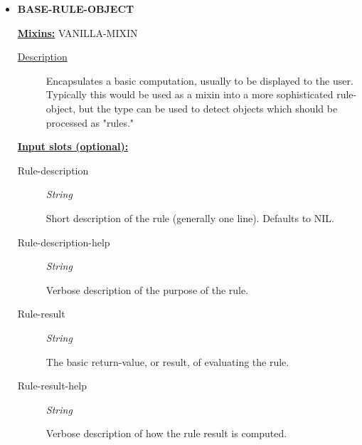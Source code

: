 \documentclass [11pt]{book}
\begin{document}
\begin{itemize}

\item {}
\label{prim:base-rule-object}
\textbf{BASE-RULE-OBJECT}


\textbf{
\underline{Mixins:}} VANILLA-MIXIN





\begin{description}

\item [
\underline{Description}]


Encapsulates a basic computation, usually to be displayed to the user.
Typically this would be used as a mixin into a more sophisticated rule-object, but the type can be
 used to detect objects which should be processed as "rules."



\end{description}








\textbf{
\underline{Input slots (optional):}}

\begin{description}

\item [Rule-description]
\emph{String}

 Short description of the rule (generally one line). Defaults to NIL.




\item [Rule-description-help]
\emph{String}

 Verbose description of the purpose of the rule.




\item [Rule-result]
\emph{String}

 The basic return-value, or result, of evaluating the rule.




\item [Rule-result-help]
\emph{String}

 Verbose description of how the rule result is computed.





\end{description}
\end{itemize}
\end{document}
